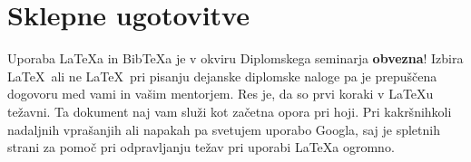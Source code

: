 \documentclass[a4paper, 12pt]{book}
\newcommand{\BibTeX}{{\sc Bib}\TeX}
\begin{document}
\chapter{Sklepne ugotovitve}
Uporaba \LaTeX{a} in \BibTeX{a} je v okviru Diplomskega seminarja \textbf{obvezna}!
Izbira \LaTeX\ ali ne \LaTeX\ pri pisanju dejanske diplomske naloge pa je pre\-pu\-šče\-na dogovoru med vami in vašim mentorjem.
Res je, da so prvi koraki v \LaTeX{}u težavni. 
Ta dokument naj vam služi kot začetna opora pri hoji.
Pri kakršnihkoli nadaljnih vprašanjih ali napakah pa svetujem uporabo Googla, saj je spletnih strani za pomoč pri odpravljanju težav pri uporabi \LaTeX{}a ogromno.
\newpage %
\ \\
\clearpage
{}


\end{document}
